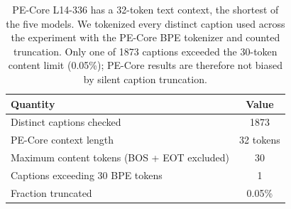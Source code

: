 \begin{table}[h]
\centering
\caption{PE-Core L14-336 has a 32-token text context, the shortest of the five models. We tokenized every distinct caption used across the experiment with the PE-Core BPE tokenizer and counted truncation. Only one of 1873 captions exceeded the 30-token content limit (0.05\%); PE-Core results are therefore not biased by silent caption truncation.}
\label{tab:t7_pecore}
\small
\begin{tabular}{lc}
\toprule
Quantity & Value \\
\midrule
Distinct captions checked & 1873 \\
PE-Core context length & 32 tokens \\
Maximum content tokens (BOS + EOT excluded) & 30 \\
Captions exceeding 30 BPE tokens & 1 \\
Fraction truncated & 0.05\% \\
\bottomrule
\end{tabular}
\end{table}